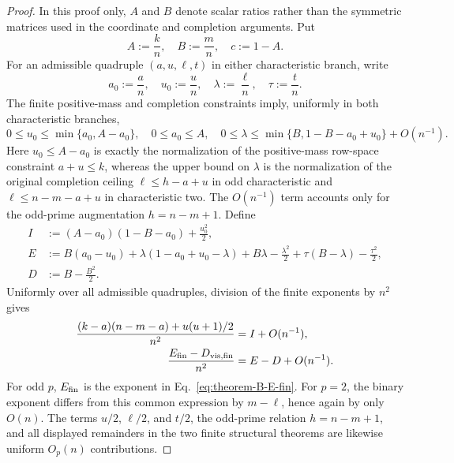 \documentclass[11pt]{article}
\newcommand{\1}{\mathbf 1}
\theoremstyle{plain}
\theoremstyle{definition}
\theoremstyle{remark}
\begin{document}
\begin{proof}
In this proof only, $A$ and $B$ denote scalar ratios rather than the
symmetric matrices used in the coordinate and completion arguments.  Put
\begin{equation}
 A:=\frac{k}{n},\quad B:=\frac{m}{n},\quad c:=1-A.
 \label{eq:direct-finite-ABc}
\end{equation}
For an admissible quadruple $(a,u,\ell,t)$ in either characteristic branch,
write
\begin{equation}
 a_0:=\frac an,\quad u_0:=\frac un,
 \quad \lambda:=\frac\ell n,\quad \tau:=\frac tn.
 \label{eq:direct-finite-normalized-variables}
\end{equation}
The finite positive-mass and completion constraints imply, uniformly in both
characteristic branches,
\begin{equation}
 0\le u_0\le\min\{a_0,A-a_0\},\quad
 0\le a_0\le A,\quad
 0\le\lambda\le\min\{B,1-B-a_0+u_0\}+O(n^{-1}).
 \label{eq:direct-finite-normalized-feasibility}
\end{equation}
Here $u_0\le A-a_0$ is exactly the normalization of the positive-mass
row-space constraint $a+u\le k$, whereas the upper bound on $\lambda$ is
the normalization of the original completion ceiling
$\ell\le h-a+u$ in odd characteristic and
$\ell\le n-m-a+u$ in characteristic two.  The $O(n^{-1})$ term accounts
only for the odd-prime augmentation $h=n-m+1$.  Define
\begin{align}
 I&:=(A-a_0)(1-B-a_0)+\frac{u_0^2}{2},
 \label{eq:direct-finite-I}\\
 E&:=B(a_0-u_0)
 +\lambda(1-a_0+u_0-\lambda)
 +B\lambda-\frac{\lambda^2}{2}
 +\tau(B-\lambda)-\frac{\tau^2}{2},
 \label{eq:direct-finite-E}\\
 D&:=B-\frac{B^2}{2}.
 \label{eq:direct-finite-D}
\end{align}
Uniformly over all admissible quadruples, division of the finite exponents by
$n^2$ gives
\begin{align}
 \frac{(k-a)(n-m-a)+u(u+1)/2}{n^2}
 &=I+O(n^{-1}),
 \label{eq:direct-finite-hidden-normalization}\\
 \frac{E_{\rm fin}-D_{\rm vis,fin}}{n^2}
 &=E-D+O(n^{-1}).
 \label{eq:direct-finite-visible-normalization}
\end{align}
For odd $p$, $E_{\rm fin}$ is the exponent in
Eq.~\eqref{eq:theorem-B-E-fin}.  For $p=2$, the binary exponent differs from
this common expression by $m-\ell$, hence again by only $O(n)$.  The terms
$u/2$, $\ell/2$, and $t/2$, the odd-prime relation $h=n-m+1$, and all displayed
remainders in the two finite structural theorems are likewise uniform
$O_p(n)$ contributions.


\end{proof}
\end{document}

